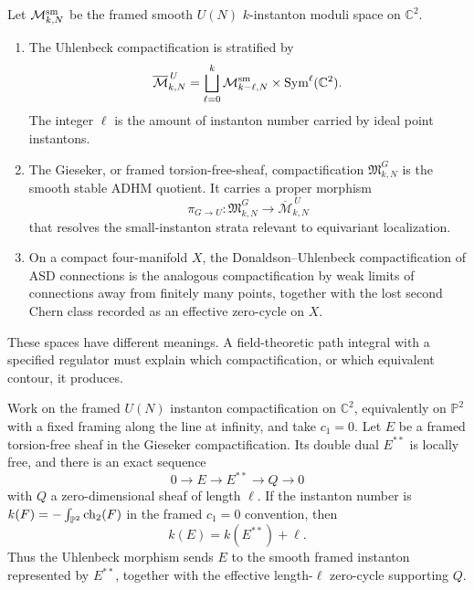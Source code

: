 \begin{definition}
\label{def:framed-instanton-compactifications-c2}
Let \(\mathcal M_{k,N}^{\rm sm}\) be the framed smooth \(U(N)\)
\(k\)-instanton moduli space on \(\mathbb C^2\).
\begin{enumerate}
  \item The Uhlenbeck compactification is stratified by
  \begin{equation}
    \overline{\mathcal M}_{k,N}^{\,U}
    =
    \bigsqcup_{\ell=0}^{k}
    \mathcal M_{k-\ell,N}^{\rm sm}\times
    {\rm Sym}^{\ell}(\mathbb C^2).
    \label{eq:uhlenbeck-stratification-c2}
  \end{equation}
  The integer \(\ell\) is the amount of instanton number carried by ideal
  point instantons.
  \item The Gieseker, or framed torsion-free-sheaf, compactification
  \(\mathfrak M_{k,N}^{G}\) is the smooth stable ADHM quotient.  It carries
  a proper morphism
  \[
    \pi_{G\to U}:\mathfrak M_{k,N}^{G}
    \longrightarrow
    \overline{\mathcal M}_{k,N}^{\,U}
  \]
  that resolves the small-instanton strata relevant to equivariant
  localization.
  \item On a compact four-manifold \(X\), the Donaldson--Uhlenbeck
  compactification of ASD connections is the analogous compactification by
  weak limits of connections away from finitely many points, together with
  the lost second Chern class recorded as an effective zero-cycle on \(X\).
\end{enumerate}
These spaces have different meanings.  A field-theoretic path integral with
a specified regulator must explain which compactification, or which
equivalent contour, it produces.
\end{definition}

\begin{construction}
\label{cons:gieseker-uhlenbeck-charge-bookkeeping}
Work on the framed \(U(N)\) instanton compactification on \(\mathbb C^2\),
equivalently on \(\mathbb P^2\) with a fixed framing along the line at
infinity, and take \(c_1=0\).  Let \(E\) be a framed torsion-free sheaf in
the Gieseker compactification.  Its double dual \(E^{\ast\ast}\) is locally
free, and there is an exact sequence
\begin{equation}
  0\longrightarrow E\longrightarrow E^{\ast\ast}
  \longrightarrow Q\longrightarrow0
  \label{eq:torsion-free-double-dual-quotient}
\end{equation}
with \(Q\) a zero-dimensional sheaf of length \(\ell\).  If the instanton
number is \(k(F)=-\int_{\mathbb P^2}{\rm ch}_2(F)\) in the framed
\(c_1=0\) convention, then
\begin{equation}
  k(E)=k(E^{\ast\ast})+\ell .
  \label{eq:gieseker-uhlenbeck-charge-split}
\end{equation}
Thus the Uhlenbeck morphism sends \(E\) to the smooth framed instanton
represented by \(E^{\ast\ast}\), together with the effective length-\(\ell\)
zero-cycle supporting \(Q\).
\end{construction}

